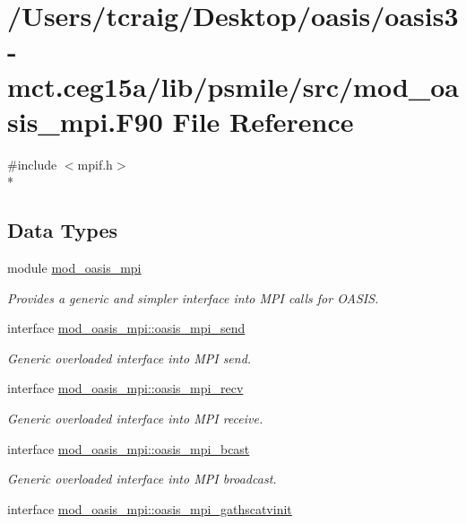 \hypertarget{mod__oasis__mpi_8_f90}{\section{/\+Users/tcraig/\+Desktop/oasis/oasis3-\/mct.ceg15a/lib/psmile/src/mod\+\_\+oasis\+\_\+mpi.F90 File Reference}
\label{mod__oasis__mpi_8_f90}
}
{\ttfamily \#include $<$mpif.\+h$>$}\\*
\subsection*{Data Types}
\begin{DoxyCompactItemize}
\item 
module \hyperlink{classmod__oasis__mpi}{mod\+\_\+oasis\+\_\+mpi}
\begin{DoxyCompactList}\small\item\em Provides a generic and simpler interface into M\+P\+I calls for O\+A\+S\+I\+S. \end{DoxyCompactList}\item 
interface \hyperlink{interfacemod__oasis__mpi_1_1oasis__mpi__send}{mod\+\_\+oasis\+\_\+mpi\+::oasis\+\_\+mpi\+\_\+send}
\begin{DoxyCompactList}\small\item\em Generic overloaded interface into M\+P\+I send. \end{DoxyCompactList}\item 
interface \hyperlink{interfacemod__oasis__mpi_1_1oasis__mpi__recv}{mod\+\_\+oasis\+\_\+mpi\+::oasis\+\_\+mpi\+\_\+recv}
\begin{DoxyCompactList}\small\item\em Generic overloaded interface into M\+P\+I receive. \end{DoxyCompactList}\item 
interface \hyperlink{interfacemod__oasis__mpi_1_1oasis__mpi__bcast}{mod\+\_\+oasis\+\_\+mpi\+::oasis\+\_\+mpi\+\_\+bcast}
\begin{DoxyCompactList}\small\item\em Generic overloaded interface into M\+P\+I broadcast. \end{DoxyCompactList}\item 
interface \hyperlink{interfacemod__oasis__mpi_1_1oasis__mpi__gathscatvinit}{mod\+\_\+oasis\+\_\+mpi\+::oasis\+\_\+mpi\+\_\+gathscatvinit}

\end{DoxyCompactItemize}
